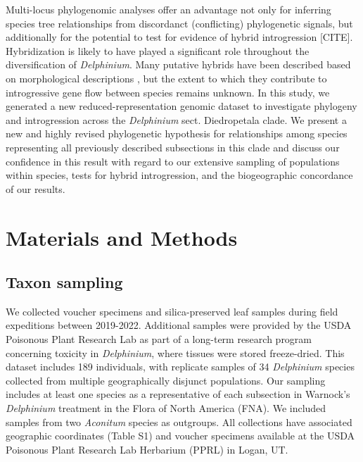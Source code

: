 \documentclass[11pt]{article}
\begin{document}
Multi-locus phylogenomic analyses offer an advantage not only for inferring
species tree relationships from discordanct (conflicting) phylogenetic signals, 
but additionally for the potential to test for evidence of hybrid introgression
[CITE].
% 
Hybridization is likely to have played a significant role throughout the 
diversification of \emph{Delphinium}. 
Many putative hybrids have been described based on morphological descriptions 
\citep{ewan_1945, warnock_1997},
but the extent to which they contribute to introgressive gene 
flow between species remains unknown.
% 
% 
In this study, we generated a new reduced-representation genomic dataset to 
investigate phylogeny and introgression across the \emph{Delphinium} sect. 
Diedropetala clade. 
% 
We present a new and highly revised phylogenetic hypothesis for relationships
among species representing all previously described subsections in this clade 
and discuss our confidence in this result with regard to our 
extensive sampling of populations within species, tests for hybrid 
introgression, and the biogeographic concordance of our results.



\section{Materials and Methods}

\subsection{Taxon sampling}
We collected voucher specimens and silica-preserved leaf samples during field expeditions
between 2019-2022. Additional samples were provided by the USDA Poisonous Plant Research
Lab as part of a long-term research program concerning toxicity in \emph{Delphinium}, where
tissues were stored freeze-dried.
% 
This dataset includes 189 individuals, with replicate samples of 34 \emph{Delphinium} species collected from multiple geographically disjunct populations. Our sampling includes
at least one species as a representative of each subsection in Warnock’s \emph{Delphinium} treatment in the Flora of North America (FNA). 
We included samples from two \emph{Aconitum} species as outgroups.
All collections have associated geographic coordinates (Table S1) and voucher 
specimens available at the USDA Poisonous Plant Research Lab Herbarium (PPRL)
in Logan, UT.
\end{document}
